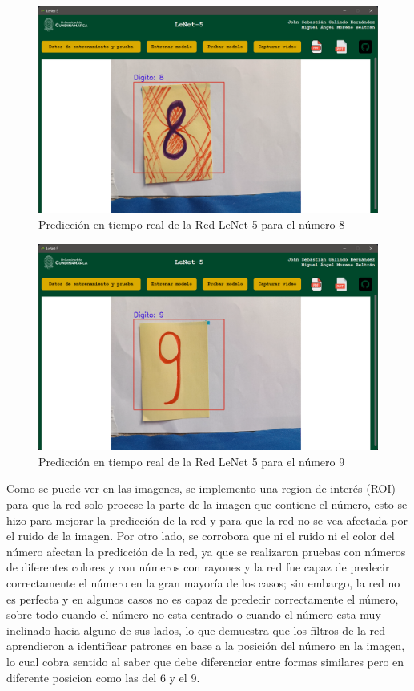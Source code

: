 \begin{figure}[H]
    \centering
    \includegraphics[width=\linewidth]{src/figures/real_test_image_8.png}
    \caption{Predicción en tiempo real de la Red LeNet 5 para el número 8}
    \label{fig:RealTest_8}
\end{figure}

\begin{figure}[H]
    \centering
    \includegraphics[width=\linewidth]{src/figures/real_test_image_9.png}
    \caption{Predicción en tiempo real de la Red LeNet 5 para el número 9}
    \label{fig:RealTest_9}
\end{figure}

Como se puede ver en las imagenes, se implemento una region de interés (ROI) para que la red solo procese
la parte de la imagen que contiene el número, esto se hizo para mejorar la predicción de la red y para que
la red no se vea afectada por el ruido de la imagen. Por otro lado, se corrobora que ni el ruido ni el color
del número afectan la predicción de la red, ya que se realizaron pruebas con números de diferentes colores y
con números con rayones y la red fue capaz de predecir correctamente el número en la gran mayoría de los casos; 
sin embargo, la red no es perfecta y en algunos casos no es capaz de predecir correctamente el número, sobre todo
cuando el número no esta centrado o cuando el número esta muy inclinado hacia alguno de sus lados, lo que demuestra
que los filtros de la red aprendieron a identificar patrones en base a la posición del número en la imagen, lo cual
cobra sentido al saber que debe diferenciar entre formas similares pero en diferente posicion como las del 6 y el 9.